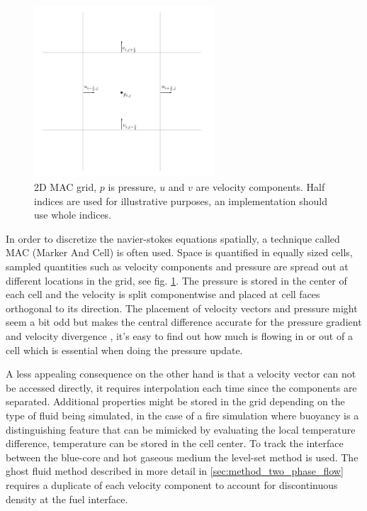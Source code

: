 \begin{figure}[h!]
\label{fig:mac-grid}
\centering
\includegraphics[width=0.6\textwidth]{mac.png}
\caption{2D MAC grid, $p$ is pressure, $u$ and $v$ are velocity components. Half indices are used for illustrative purposes, an implementation should use whole indices.}
\end{figure}

In order to discretize the navier-stokes equations spatially, a technique called MAC (Marker And Cell) is often used. Space is quantified in equally sized cells, sampled quantities such as velocity components and pressure are spread out at different locations in the grid, see fig. \ref{fig:mac-grid}. The pressure is stored in the center of each cell and the velocity is split componentwise and placed at cell faces orthogonal to its direction. 
The placement of velocity vectors and pressure might seem a bit odd but makes the central difference accurate for the pressure gradient and velocity divergence \cite{bridson}, it's easy to find out how much is flowing in or out of a cell which is essential when doing the pressure update. 

A less appealing consequence on the other hand is that a velocity vector can not be accessed directly, it requires interpolation each time since the components are separated. Additional properties might be stored in the grid depending on the type of fluid being simulated, in the case of a fire simulation where buoyancy is a distinguishing feature that can be mimicked by evaluating the local temperature difference, temperature can be stored in the cell center. To track the interface between the blue-core and hot gaseous medium the level-set method is used. The ghost fluid method described in more detail in \ref{sec:method_two_phase_flow} requires a duplicate of each velocity component to account for discontinuous density at the fuel interface.


